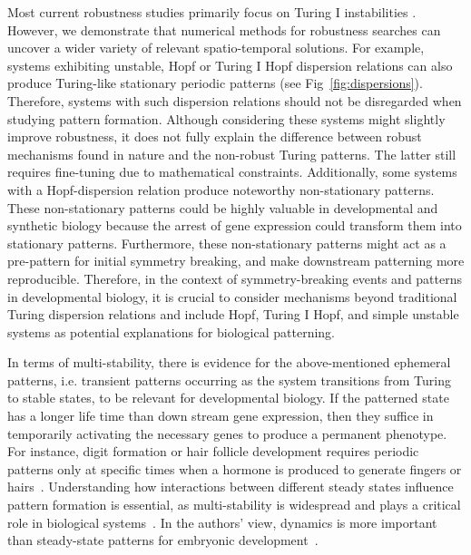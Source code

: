 \documentclass[10pt,letterpaper]{article}
\begin{document}
Most current robustness studies primarily focus on Turing I instabilities \cite{Scholes2019, Zheng2016, Marcon}.
However, we demonstrate that numerical methods for robustness searches can uncover a wider variety of relevant spatio-temporal solutions.
For example, systems exhibiting unstable, Hopf or Turing I Hopf dispersion relations can also produce Turing-like stationary periodic patterns (see Fig~\ref{fig:dispersions}). Therefore, systems with such dispersion relations should not be disregarded when studying pattern formation.
Although considering these systems might slightly improve robustness, it does not fully explain the difference between robust mechanisms found in nature and the non-robust Turing patterns. The latter still requires fine-tuning due to mathematical constraints.
Additionally, some systems with a Hopf-dispersion relation produce noteworthy non-stationary patterns.
These non-stationary patterns could be highly valuable in developmental and synthetic biology because the arrest of gene expression could transform them into stationary patterns.
Furthermore, these non-stationary patterns might act as a pre-pattern for initial symmetry breaking, and make downstream patterning more reproducible. 
Therefore, in the context of symmetry-breaking events and patterns in developmental biology, it is crucial to consider mechanisms beyond traditional Turing dispersion relations and include Hopf, Turing I Hopf, and simple unstable systems as potential explanations for biological patterning.


In terms of multi-stability, there is evidence for the above-mentioned ephemeral patterns, i.e. transient patterns occurring as the system transitions from Turing to stable states, to be relevant for developmental biology. If the patterned state has a longer life time than down stream gene expression, then they suffice in temporarily activating the necessary genes to produce a permanent phenotype.
For instance, digit formation or hair follicle development requires periodic patterns only at specific times when a hormone is produced to generate fingers or hairs~\cite{raspopovic2014digit,glover2023developmental}. 
Understanding how interactions between different steady states influence pattern formation is essential, as multi-stability is widespread and plays a critical role in biological systems~\cite{laurent1999multistability}. In the authors' view, dynamics is more important than steady-state patterns for embryonic development~\cite{pezzotta2023optimal}.
\end{document}
